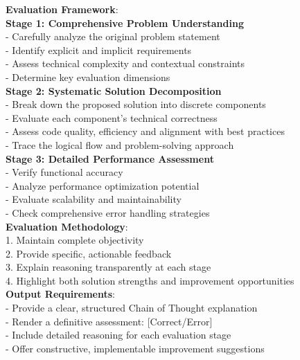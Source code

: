 \documentclass[11pt, a4paper, logo, copyright, nonumbering, amsart]{map}
\begin{document}
\begin{CJK*}{UTF8}{gbsn}
\begin{figure*}[h!]
\begin{center}
\begin{tcolorbox}[width=1\textwidth, colback=lightblue, title={\textbf{Basic Critique Evaluation Prompt (with CoT)}}]
    \textbf{Evaluation Framework}:\\
    
    \textbf{Stage 1: Comprehensive Problem Understanding}\\
    - Carefully analyze the original problem statement\\
    - Identify explicit and implicit requirements\\
    - Assess technical complexity and contextual constraints\\
    - Determine key evaluation dimensions\\
    
    \textbf{Stage 2: Systematic Solution Decomposition}\\
    - Break down the proposed solution into discrete components\\
    - Evaluate each component's technical correctness\\
    - Assess code quality, efficiency and alignment with best practices\\
    - Trace the logical flow and problem-solving approach\\
    
    \textbf{Stage 3: Detailed Performance Assessment}\\
    - Verify functional accuracy \\
    - Analyze performance optimization potential\\
    - Evaluate scalability and maintainability\\
    - Check comprehensive error handling strategies\\
    
    \textbf{Evaluation Methodology}:\\
    1. Maintain complete objectivity\\
    2. Provide specific, actionable feedback\\
    3. Explain reasoning transparently at each stage\\
    4. Highlight both solution strengths and improvement opportunities\\
    
    \textbf{Output Requirements}:\\
    - Provide a clear, structured Chain of Thought explanation\\
    - Render a definitive assessment: [Correct/Error]\\
    - Include detailed reasoning for each evaluation stage\\
    - Offer constructive, implementable improvement suggestions\\
    

\end{tcolorbox}
\end{center}
\end{figure*}
\end{CJK*}
\end{document}

